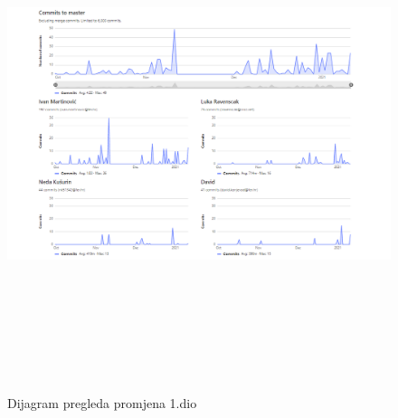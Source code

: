 		\begin{figure}[H]
			\includegraphics[width=175mm,height=150mm]{slike/aktivnost_1.png} %
			\centering
			\caption{Dijagram pregleda promjena 1.dio}
			\label{fig:dijagrami_pregleda_promjena}
		\end{figure}
